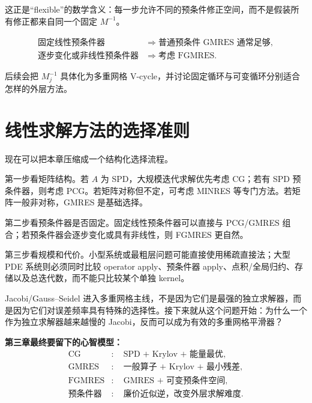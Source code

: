 这正是“flexible”的数学含义：每一步允许不同的预条件修正空间，而不是假装所有修正都来自同一个固定 $M^{-1}$。

\begin{keybox}
\[
\boxed{
\begin{aligned}
\text{固定线性预条件器}
&\Rightarrow
\text{普通预条件 GMRES 通常足够},
\\
\text{逐步变化或非线性预条件器}
&\Rightarrow
\text{考虑 FGMRES}.
\end{aligned}
}
\]
\end{keybox}

后续会把 $M_j^{-1}$ 具体化为多重网格 V-cycle，并讨论固定循环与可变循环分别适合怎样的外层方法。

\section{线性求解方法的选择准则}

现在可以把本章压缩成一个结构化选择流程。

第一步看矩阵结构。若 $A$ 为 SPD，大规模迭代求解优先考虑 CG；若有 SPD 预条件器，则考虑 PCG。若矩阵对称但不定，可考虑 MINRES 等专门方法。若矩阵一般非对称，GMRES 是基础选择。

第二步看预条件器是否固定。固定线性预条件器可以直接与 PCG/GMRES 组合；若预条件器会逐步变化或具有非线性，则 FGMRES 更自然。

第三步看规模和代价。小型系统或最粗层问题可能直接使用稀疏直接法；大型 PDE 系统则必须同时比较 operator apply、预条件器 apply、点积/全局归约、存储以及总迭代数，而不能只比较某个单独 kernel。

Jacobi/Gauss--Seidel 进入多重网格主线，不是因为它们是最强的独立求解器，而是因为它们对误差频率具有特殊的选择性。接下来就从这个问题开始：为什么一个作为独立求解器越来越慢的 Jacobi，反而可以成为有效的多重网格平滑器？

\begin{keybox}
\textbf{第三章最终要留下的心智模型：}
\[
\boxed{
\begin{aligned}
\text{CG}
&:\quad
\text{SPD + Krylov + 能量最优},
\\
\text{GMRES}
&:\quad
\text{一般算子 + Krylov + 最小残差},
\\
\text{FGMRES}
&:\quad
\text{GMRES + 可变预条件空间},
\\
\text{预条件器}
&:\quad
\text{廉价近似逆，改变外层求解难度}.
\end{aligned}
}
\]
\end{keybox}

